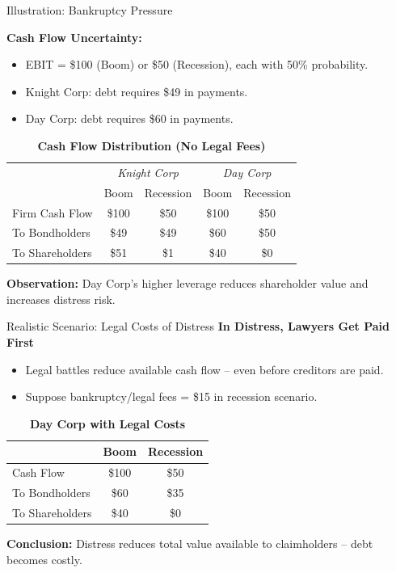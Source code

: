 \begin{frame}{Illustration: Bankruptcy Pressure}
	
	\textbf{Cash Flow Uncertainty:}
	
	\begin{itemize}
		\item EBIT = \$100 (Boom) or \$50 (Recession), each with 50\% probability.
		\item Knight Corp: debt requires \$49 in payments.
		\item Day Corp: debt requires \$60 in payments.
	\end{itemize}
	
	\vspace{0.2cm}
	\begin{table}
		\centering
		\caption*{\textbf{Cash Flow Distribution (No Legal Fees)}}
		\begin{tabular}{@{}lcccc@{}}
			\toprule
			& \multicolumn{2}{c}{\textit{Knight Corp}} & \multicolumn{2}{c}{\textit{Day Corp}} \\
			& Boom & Recession & Boom & Recession \\ \midrule
			Firm Cash Flow & \$100 & \$50 & \$100 & \$50 \\
			To Bondholders & \$49 & \$49 & \$60 & \$50 \\
			To Shareholders & \$51 & \$1 & \$40 & \$0 \\ \bottomrule
		\end{tabular}
	\end{table}
	
	\vspace{0.2cm}
	\textbf{Observation:}  
	Day Corp's higher leverage reduces shareholder value and increases distress risk.
\end{frame}

\begin{frame}{Realistic Scenario: Legal Costs of Distress}
	\textbf{In Distress, Lawyers Get Paid First}
	
	\begin{itemize}
		\item Legal battles reduce available cash flow -- even before creditors are paid.
		\item Suppose bankruptcy/legal fees = \$15 in recession scenario.
	\end{itemize}
	
	\vspace{0.2cm}
	\begin{table}
		\centering
		\caption*{\textbf{Day Corp with Legal Costs}}
		\begin{tabular}{@{}lcc@{}}
			\toprule
			& Boom & Recession \\ \midrule
			Cash Flow & \$100 & \$50 \\
			To Bondholders & \$60 & \$35 \\
			To Shareholders & \$40 & \$0 \\ \bottomrule
		\end{tabular}
	\end{table}
	
	\vspace{0.2cm}
	\textbf{Conclusion:}  
	Distress reduces total value available to claimholders -- debt becomes costly.
\end{frame}


